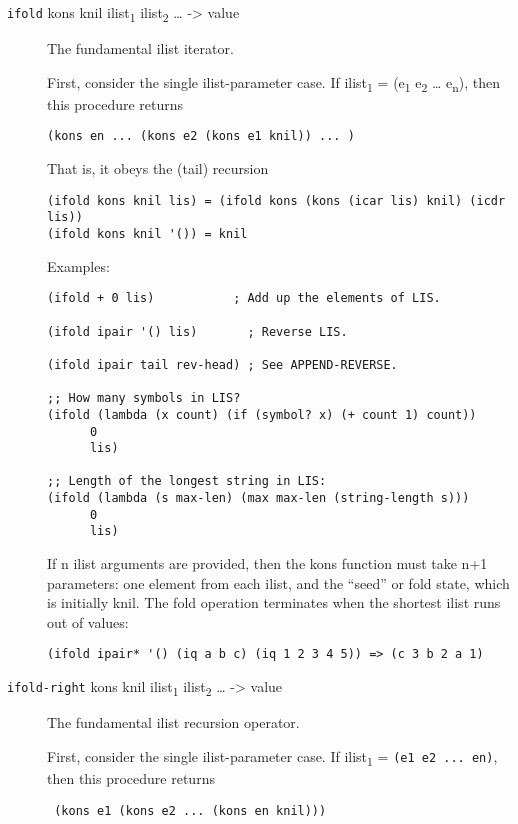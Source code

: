\begin{description}
\item[ \href{}{} \texttt{ifold} kons knil ilist\textsubscript{1}
ilist\textsubscript{2} \ldots{} -\textgreater{} value ]
The fundamental ilist iterator.

First, consider the single ilist-parameter case. If
ilist\textsubscript{1} = (e\textsubscript{1} e\textsubscript{2} \ldots{}
e\textsubscript{n}), then this procedure returns

\texttt{(kons\ en\ ...\ (kons\ e2\ (kons\ e1\ knil))\ ...\ )}

That is, it obeys the (tail) recursion

\begin{verbatim}
(ifold kons knil lis) = (ifold kons (kons (icar lis) knil) (icdr lis))
(ifold kons knil '()) = knil
\end{verbatim}

Examples:

\begin{verbatim}
(ifold + 0 lis)           ; Add up the elements of LIS.

(ifold ipair '() lis)       ; Reverse LIS.

(ifold ipair tail rev-head) ; See APPEND-REVERSE.

;; How many symbols in LIS?
(ifold (lambda (x count) (if (symbol? x) (+ count 1) count))
      0
      lis)

;; Length of the longest string in LIS:
(ifold (lambda (s max-len) (max max-len (string-length s)))
      0
      lis)
\end{verbatim}

If n ilist arguments are provided, then the kons function must take n+1
parameters: one element from each ilist, and the ``seed'' or fold state,
which is initially knil. The fold operation terminates when the shortest
ilist runs out of values:

\begin{verbatim}
(ifold ipair* '() (iq a b c) (iq 1 2 3 4 5)) => (c 3 b 2 a 1)
\end{verbatim}
\item[ \href{}{} \texttt{ifold-right} kons knil ilist\textsubscript{1}
ilist\textsubscript{2} \ldots{} -\textgreater{} value ]
The fundamental ilist recursion operator.

First, consider the single ilist-parameter case. If
ilist\textsubscript{1} = \texttt{(e1\ e2\ ...\ en)}, then this procedure
returns

\texttt{\ (kons\ e1\ (kons\ e2\ ...\ (kons\ en\ knil)))}


\end{description}
